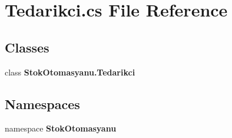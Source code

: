 \section{Tedarikci.\+cs File Reference}
\label{_tedarikci_8cs}
\subsection*{Classes}
\begin{DoxyCompactItemize}
\item 
class \textbf{ Stok\+Otomasyanu.\+Tedarikci}
\end{DoxyCompactItemize}
\subsection*{Namespaces}
\begin{DoxyCompactItemize}
\item 
namespace \textbf{ Stok\+Otomasyanu}
\end{DoxyCompactItemize}
